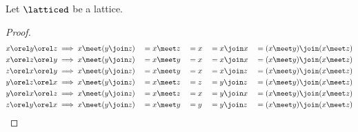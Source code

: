 

\begin{theorem}
\label{thm:lat_lin_distrib}
Let $\latticed$ be a lattice.
\end{theorem}
\begin{proof}
\begin{align*}
  x \orel y \orel z &\implies x \meet (y\join z) &&= x \meet z &&= x &&= x \join x &&= (x\meet y) \join (x \meet z) \\
  x \orel z \orel y &\implies x \meet (y\join z) &&= x \meet y &&= x &&= x \join x &&= (x\meet y) \join (x \meet z) \\
  z \orel x \orel y &\implies x \meet (y\join z) &&= x \meet y &&= x &&= x \join z &&= (x\meet y) \join (x \meet z) \\
  y \orel z \orel x &\implies x \meet (y\join z) &&= x \meet z &&= z &&= y \join z &&= (x\meet y) \join (x \meet z) \\
  y \orel x \orel z &\implies x \meet (y\join z) &&= x \meet z &&= x &&= y \join x &&= (x\meet y) \join (x \meet z) \\
  z \orel y \orel x &\implies x \meet (y\join z) &&= x \meet y &&= y &&= y \join z &&= (x\meet y) \join (x \meet z) \\
\end{align*}
\end{proof}


